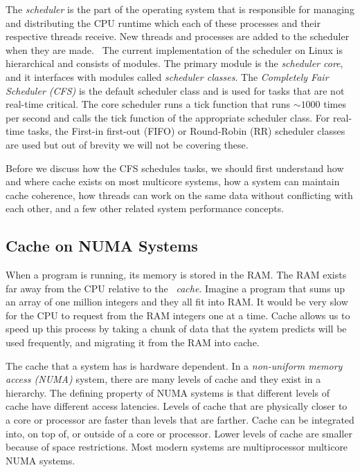 \documentclass{sig-alternate}
\begin{document}
The \emph{scheduler} is the part of the operating system that is responsible for managing and distributing the CPU runtime which each of these processes and their respective threads receive. New threads and processes are added to the scheduler when they are made.~\cite{Lozi:2016} The current implementation of the scheduler on Linux is hierarchical and consists of modules. The primary module is the \emph{scheduler core}, and it interfaces with modules called \emph{scheduler classes}. The \emph{Completely Fair Scheduler (CFS)} is the default scheduler class and is used for tasks that are not real-time critical. The core scheduler runs a tick function that runs $\sim1000$ times per second and calls the tick function of the appropriate scheduler class. For real-time tasks, the First-in first-out (FIFO) or Round-Robin (RR) scheduler classes are used but out of brevity we will not be covering these.~\cite{SchedThesis}

Before we discuss how the CFS schedules tasks, we should first understand how and where cache exists on most multicore systems, how a system can maintain cache coherence, how threads can work on the same data without conflicting with each other, and a few other related system performance concepts.

\subsection{Cache on NUMA Systems}
\label{sec:cache}

When a program is running, its memory is stored in the RAM. The RAM exists far away from the CPU relative to the ~\emph{cache}. Imagine a program that sums up an array of one million integers and they all fit into RAM. It would be very slow for the CPU to request from the RAM integers one at a time. Cache allows us to speed up this process by taking a chunk of data that the system predicts will be used frequently, and migrating it from the RAM into cache.

The cache that a system has is hardware dependent. In a \emph{non-uniform memory access (NUMA)} system, there are many levels of cache and they exist in a hierarchy. The defining property of NUMA systems is that different levels of cache have different access latencies.  Levels of cache that are physically closer to a core or processor are faster than levels that are farther. Cache can be integrated into, on top of, or outside of a core or processor. Lower levels of cache are smaller because of space restrictions. Most modern systems are multiprocessor multicore NUMA systems.
\end{document}
